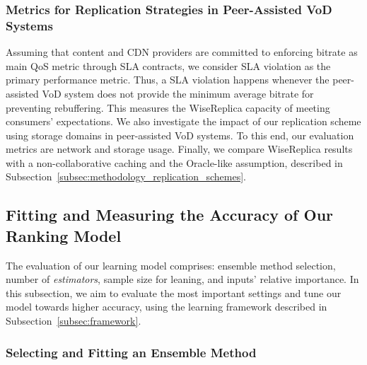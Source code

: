 \subsubsection{Metrics for Replication Strategies in Peer-Assisted VoD Systems} 

Assuming that content and CDN providers are committed to enforcing bitrate as main QoS metric through SLA contracts, we consider SLA violation as the primary performance metric. Thus, a SLA violation happens whenever the peer-assisted VoD system does not provide the minimum average bitrate for preventing rebuffering. This measures the WiseReplica capacity of meeting consumers' expectations. We also investigate the impact of our replication scheme using storage domains in peer-assisted VoD systems. To this end, our evaluation metrics are network and storage usage. Finally, we compare WiseReplica results with a non-collaborative caching and the Oracle-like assumption, described in Subsection~\ref{subsec:methodology_replication_schemes}. 

\subsection{Fitting and Measuring the Accuracy of Our Ranking Model}
\label{subsec:prediction_performance}

The evaluation of our learning model comprises: ensemble method selection, number of \emph{estimators},  sample size for leaning, and inputs' relative importance. In this subsection, we aim to evaluate the most important settings and tune our model towards higher accuracy, using the learning framework described in Subsection~\ref{subsec:framework}.

\subsubsection{Selecting and Fitting an Ensemble Method}

